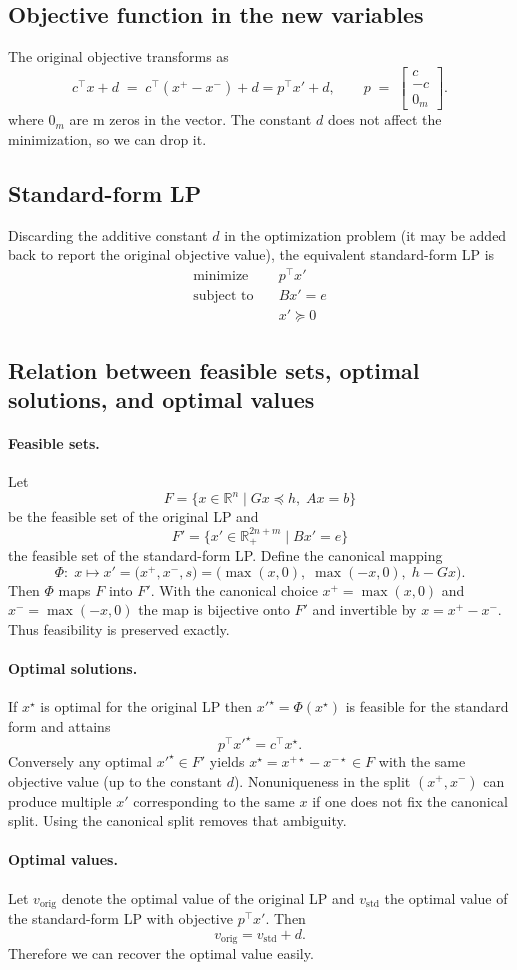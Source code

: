 \documentclass[11pt]{article}
\begin{document}
\subsection*{Objective function in the new variables}
The original objective transforms as
\[
    c^\top x + d \;=\; c^\top(x^+ - x^-) + d
    = p^\top x' + d,
    \qquad
    p \;=\; \begin{bmatrix} c \\ -c \\ 0_m \end{bmatrix}.
\]
where $0_m$ are m zeros in the vector. The constant \(d\) does not affect the minimization, so we can drop it.

\subsection*{Standard-form LP}
Discarding the additive constant \(d\) in the optimization problem (it may be added back to report the original objective value), the equivalent standard-form LP is
\begin{align*}
    \text{minimize}\quad   & p^\top x' \\
    \text{subject to}\quad & B x' = e \\
                           & x' \succeq 0
\end{align*}

\subsection*{Relation between feasible sets, optimal solutions, and optimal values}

\paragraph{Feasible sets.}
Let
\[
    F = \{x\in\mathbb{R}^n \mid Gx\preceq h,\; Ax=b\}
\]
be the feasible set of the original LP and
\[
    F' = \{x'\in\mathbb{R}^{2n+m}_{+} \mid Bx' = e\}
\]
the feasible set of the standard-form LP. Define the canonical mapping
\[
    \Phi:\; x \mapsto x' = \bigl(x^+,x^-,s\bigr)
    = \bigl(\max(x,0),\;\max(-x,0),\;h-Gx\bigr).
\]
Then \(\Phi\) maps \(F\) into \(F'\). With the canonical choice \(x^+=\max(x,0)\) and \(x^-=\max(-x,0)\) the map is bijective onto \(F'\) and invertible by \(x = x^+ - x^-\). Thus feasibility is preserved exactly.

\paragraph{Optimal solutions.}
If \(x^\star\) is optimal for the original LP then \(x'^\star=\Phi(x^\star)\) is feasible for the standard form and attains
\[
    p^\top x'^\star = c^\top x^\star.
\]
Conversely any optimal \(x'^\star\in F'\) yields \(x^\star = x^{+\star}-x^{-\star}\in F\) with the same objective value (up to the constant \(d\)). Nonuniqueness in the split \((x^+,x^-)\) can produce multiple \(x'\) corresponding to the same \(x\) if one does not fix the canonical split. Using the canonical split removes that ambiguity.

\paragraph{Optimal values.}
Let \(v_{\text{orig}}\) denote the optimal value of the original LP and \(v_{\text{std}}\) the optimal value of the standard-form LP with objective \(p^\top x'\). Then
\[
    v_{\text{orig}} = v_{\text{std}} + d.
\]
Therefore we can recover the optimal value easily. 
\end{document}

